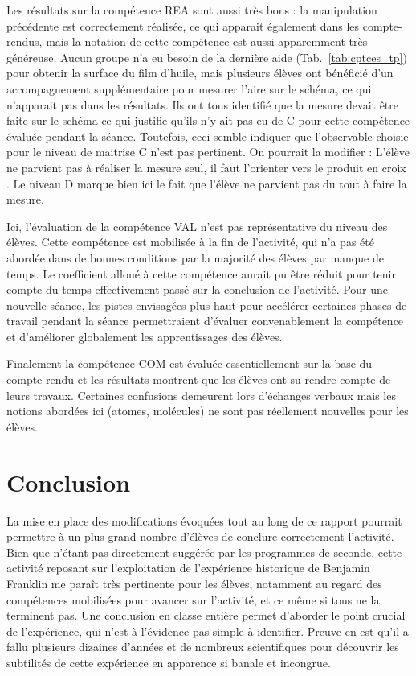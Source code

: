 \documentclass[12pt,a4paper, fleqn]{report}
\newcommand{\rea}{\colorbox{yellow_c}{\textcolor{yellow_f}{REA}}}
\newcommand{\val}{\colorbox{orange_c}{\textcolor{orange_f}{VAL}}}
\newcommand{\com}{\colorbox{red_c}{\textcolor{red_f}{COM}}}
\begin{document}
Les résultats sur la compétence \rea{} sont aussi très bons : la manipulation précédente est correctement réalisée, ce qui apparait également dans les compte-rendus, mais la notation de cette compétence est aussi apparemment très généreuse.
Aucun groupe n'a eu besoin de la dernière aide (Tab.~\ref{tab:cptces_tp}) pour obtenir la surface du film d'huile, mais plusieurs élèves ont bénéficié d'un accompagnement supplémentaire pour mesurer l'aire sur le schéma, ce qui n'apparait pas dans les résultats.
Ils ont tous identifié que la mesure devait être faite sur le schéma ce qui justifie qu'ils n'y ait pas eu de C pour cette compétence évaluée pendant la séance.
Toutefois, ceci semble indiquer que l'observable choisie pour le niveau de maitrise C n'est pas pertinent. On pourrait la modifier : \og L'élève ne parvient pas à réaliser la mesure seul, il faut l'orienter vers le produit en croix \fg{}.
Le niveau D marque bien ici le fait que l'élève ne parvient pas du tout à faire la mesure.

Ici, l'évaluation de la compétence \val{} n'est pas représentative du niveau des élèves.
Cette compétence est mobilisée à la fin de l'activité, qui n'a pas été abordée dans de bonnes conditions par la majorité des élèves par manque de temps.
Le coefficient alloué à cette compétence aurait pu être réduit pour tenir compte du temps effectivement passé sur la conclusion de l'activité.
Pour une nouvelle séance, les pistes envisagées plus haut pour accélérer certaines phases de travail pendant la séance permettraient d'évaluer convenablement la compétence et d'améliorer globalement les apprentissages des élèves.

Finalement la compétence \com{} est évaluée essentiellement sur la base du compte-rendu et les résultats montrent que les élèves ont su rendre compte de leurs travaux.
Certaines confusions demeurent lors d'échanges verbaux mais les notions abordées ici (atomes, molécules) ne sont pas réellement nouvelles pour les élèves.

\section*{Conclusion}

La mise en place des modifications évoquées tout au long de ce rapport pourrait permettre à un plus grand nombre d'élèves de conclure correctement l'activité.
Bien que n'étant pas directement suggérée par les programmes de seconde, cette activité reposant sur l'exploitation de l'expérience historique de Benjamin Franklin me paraît très pertinente pour les élèves, notamment au regard des compétences mobilisées pour avancer sur l'activité, et ce même si tous ne la terminent pas.
Une conclusion en classe entière permet d'aborder le point crucial de l'expérience, qui n'est à l'évidence pas simple à identifier.
Preuve en est qu'il a fallu plusieurs dizaines d'années et de nombreux scientifiques pour découvrir les subtilités de cette expérience en apparence si banale et incongrue.
\end{document}
